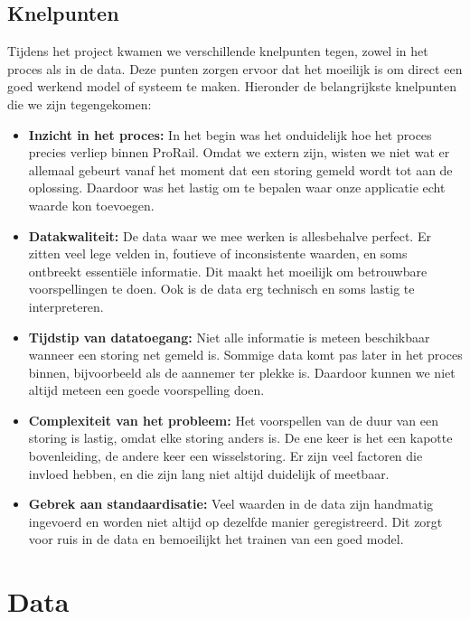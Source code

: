 \documentclass{article}
\begin{document}
\subsection{Knelpunten}
Tijdens het project kwamen we verschillende knelpunten tegen, zowel in het proces als in de data. Deze punten zorgen ervoor dat het moeilijk is om direct een goed werkend model of systeem te maken. Hieronder de belangrijkste knelpunten die we zijn tegengekomen:

\begin{itemize}
  \item \textbf{Inzicht in het proces:} In het begin was het onduidelijk hoe het proces precies verliep binnen ProRail. Omdat we extern zijn, wisten we niet wat er allemaal gebeurt vanaf het moment dat een storing gemeld wordt tot aan de oplossing. Daardoor was het lastig om te bepalen waar onze applicatie echt waarde kon toevoegen.
  \item \textbf{Datakwaliteit:} De data waar we mee werken is allesbehalve perfect. Er zitten veel lege velden in, foutieve of inconsistente waarden, en soms ontbreekt essentiële informatie. Dit maakt het moeilijk om betrouwbare voorspellingen te doen. Ook is de data erg technisch en soms lastig te interpreteren.
  \item \textbf{Tijdstip van datatoegang:} Niet alle informatie is meteen beschikbaar wanneer een storing net gemeld is. Sommige data komt pas later in het proces binnen, bijvoorbeeld als de aannemer ter plekke is. Daardoor kunnen we niet altijd meteen een goede voorspelling doen.
  \item \textbf{Complexiteit van het probleem:} Het voorspellen van de duur van een storing is lastig, omdat elke storing anders is. De ene keer is het een kapotte bovenleiding, de andere keer een wisselstoring. Er zijn veel factoren die invloed hebben, en die zijn lang niet altijd duidelijk of meetbaar.
  \item \textbf{Gebrek aan standaardisatie:} Veel waarden in de data zijn handmatig ingevoerd en worden niet altijd op dezelfde manier geregistreerd. Dit zorgt voor ruis in de data en bemoeilijkt het trainen van een goed model.
\end{itemize}

\newpage
\section{Data}
\end{document}
